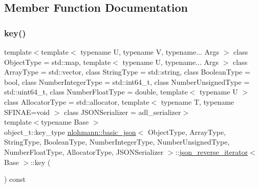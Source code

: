 \subsection{Member Function Documentation}
\mbox{\label{classnlohmann_1_1basic__json_1_1json__reverse__iterator_a26c551e1cee90ee52be00b5165804598}} 
\subsubsection{\texorpdfstring{key()}{key()}}
{\footnotesize\ttfamily template$<$template$<$ typename U, typename V, typename... Args $>$ class Object\+Type = std\+::map, template$<$ typename U, typename... Args $>$ class Array\+Type = std\+::vector, class String\+Type  = std\+::string, class Boolean\+Type  = bool, class Number\+Integer\+Type  = std\+::int64\+\_\+t, class Number\+Unsigned\+Type  = std\+::uint64\+\_\+t, class Number\+Float\+Type  = double, template$<$ typename U $>$ class Allocator\+Type = std\+::allocator, template$<$ typename T, typename S\+F\+I\+N\+A\+E=void $>$ class J\+S\+O\+N\+Serializer = adl\+\_\+serializer$>$ \\
template$<$typename Base $>$ \\
object\+\_\+t\+::key\+\_\+type \mbox{\hyperlink{classnlohmann_1_1basic__json}{nlohmann\+::basic\+\_\+json}}$<$ Object\+Type, Array\+Type, String\+Type, Boolean\+Type, Number\+Integer\+Type, Number\+Unsigned\+Type, Number\+Float\+Type, Allocator\+Type, J\+S\+O\+N\+Serializer $>$\+::\mbox{\hyperlink{classnlohmann_1_1basic__json_1_1json__reverse__iterator}{json\+\_\+reverse\+\_\+iterator}}$<$ Base $>$\+::key (\begin{DoxyParamCaption}{ }\end{DoxyParamCaption}) const\hspace{0.3cm}{\ttfamily [inline]}}



